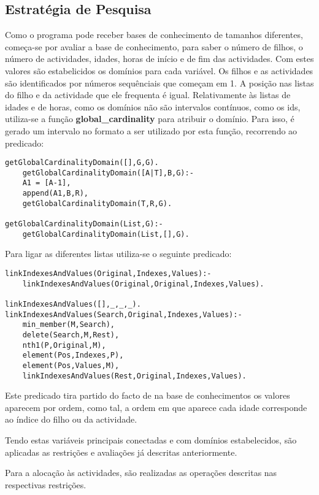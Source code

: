 \documentclass[runningheads]{llncs}
\begin{document}
\subsection{Estratégia de Pesquisa}

Como o programa pode receber bases de conhecimento de tamanhos diferentes, começa-se por avaliar a base de conhecimento, para saber o número de filhos, o número de actividades, idades, horas de início e de fim das actividades. Com estes valores são estabelicidos os domínios para cada variável. Os filhos e as actividades são identificados por números sequênciais que começam em 1. A posição nas listas do filho e da actividade que ele frequenta é igual.
Relativamente às listas de idades e de horas, como os domínios não são intervalos contínuos, como os ids, utiliza-se a função \textbf{global\_cardinality} para atribuir o domínio. Para isso, é gerado um intervalo no formato a ser utilizado por esta função, recorrendo ao predicado:

\begin{lstlisting}
getGlobalCardinalityDomain([],G,G).
	getGlobalCardinalityDomain([A|T],B,G):-
	A1 = [A-1],
	append(A1,B,R),
	getGlobalCardinalityDomain(T,R,G).

getGlobalCardinalityDomain(List,G):-
	getGlobalCardinalityDomain(List,[],G).
\end{lstlisting}

Para ligar as diferentes listas utiliza-se o seguinte predicado:

\begin{lstlisting}
linkIndexesAndValues(Original,Indexes,Values):-
	linkIndexesAndValues(Original,Original,Indexes,Values).

linkIndexesAndValues([],_,_,_).
linkIndexesAndValues(Search,Original,Indexes,Values):-
	min_member(M,Search),
	delete(Search,M,Rest),
	nth1(P,Original,M),
	element(Pos,Indexes,P),
	element(Pos,Values,M),
	linkIndexesAndValues(Rest,Original,Indexes,Values).
\end{lstlisting}

Este predicado tira partido do facto de na base de conhecimentos os valores aparecem por ordem, como tal, a ordem em que aparece cada idade corresponde ao índice do filho ou da actividade.

Tendo estas variáveis principais conectadas e com domínios estabelecidos, são aplicadas as restrições e avaliações já descritas anteriormente.

Para a alocação às actividades, são realizadas as operações descritas nas respectivas restrições.
\end{document}
